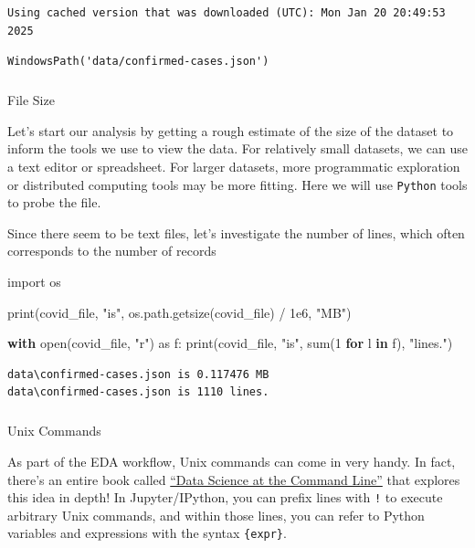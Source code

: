 \documentclass[
  letterpaper,
  DIV=11,
  numbers=noendperiod]{scrreprt}
\makeatletter
\let\oldsubparagraph\subparagraph
\renewcommand{\subparagraph}{
    \@ifstar
      \xxxSubParagraphStar
      \xxxSubParagraphNoStar
  }
\newcommand{\xxxSubParagraphStar}[1]{\oldsubparagraph*{#1}\mbox{}}
\newcommand{\xxxSubParagraphNoStar}[1]{\oldsubparagraph{#1}\mbox{}}
\newenvironment{Shaded}{\begin{snugshade}}{\end{snugshade}}
\newcommand{\BuiltInTok}[1]{\textcolor[rgb]{0.00,0.23,0.31}{#1}}
\newcommand{\ControlFlowTok}[1]{\textcolor[rgb]{0.00,0.23,0.31}{\textbf{#1}}}
\newcommand{\DecValTok}[1]{\textcolor[rgb]{0.68,0.00,0.00}{#1}}
\newcommand{\FloatTok}[1]{\textcolor[rgb]{0.68,0.00,0.00}{#1}}
\newcommand{\ImportTok}[1]{\textcolor[rgb]{0.00,0.46,0.62}{#1}}
\newcommand{\KeywordTok}[1]{\textcolor[rgb]{0.00,0.23,0.31}{\textbf{#1}}}
\newcommand{\NormalTok}[1]{\textcolor[rgb]{0.00,0.23,0.31}{#1}}
\newcommand{\OperatorTok}[1]{\textcolor[rgb]{0.37,0.37,0.37}{#1}}
\newcommand{\StringTok}[1]{\textcolor[rgb]{0.13,0.47,0.30}{#1}}
\makeatother
\begin{document}
\begin{verbatim}
Using cached version that was downloaded (UTC): Mon Jan 20 20:49:53 2025
\end{verbatim}

\begin{verbatim}
WindowsPath('data/confirmed-cases.json')
\end{verbatim}

\subparagraph{File Size}\label{file-size}

Let's start our analysis by getting a rough estimate of the size of the
dataset to inform the tools we use to view the data. For relatively
small datasets, we can use a text editor or spreadsheet. For larger
datasets, more programmatic exploration or distributed computing tools
may be more fitting. Here we will use \texttt{Python} tools to probe the
file.

Since there seem to be text files, let's investigate the number of
lines, which often corresponds to the number of records

\begin{Shaded}
\begin{Highlighting}[]
\ImportTok{import}\NormalTok{ os}

\BuiltInTok{print}\NormalTok{(covid\_file, }\StringTok{"is"}\NormalTok{, os.path.getsize(covid\_file) }\OperatorTok{/} \FloatTok{1e6}\NormalTok{, }\StringTok{"MB"}\NormalTok{)}

\ControlFlowTok{with} \BuiltInTok{open}\NormalTok{(covid\_file, }\StringTok{"r"}\NormalTok{) }\ImportTok{as}\NormalTok{ f:}
    \BuiltInTok{print}\NormalTok{(covid\_file, }\StringTok{"is"}\NormalTok{, }\BuiltInTok{sum}\NormalTok{(}\DecValTok{1} \ControlFlowTok{for}\NormalTok{ l }\KeywordTok{in}\NormalTok{ f), }\StringTok{"lines."}\NormalTok{)}
\end{Highlighting}
\end{Shaded}

\begin{verbatim}
data\confirmed-cases.json is 0.117476 MB
data\confirmed-cases.json is 1110 lines.
\end{verbatim}

\subparagraph{Unix Commands}\label{unix-commands}

As part of the EDA workflow, Unix commands can come in very handy. In
fact, there's an entire book called
\href{https://datascienceatthecommandline.com/}{``Data Science at the
Command Line''} that explores this idea in depth! In Jupyter/IPython,
you can prefix lines with \texttt{!} to execute arbitrary Unix commands,
and within those lines, you can refer to Python variables and
expressions with the syntax \texttt{\{expr\}}.
\end{document}
